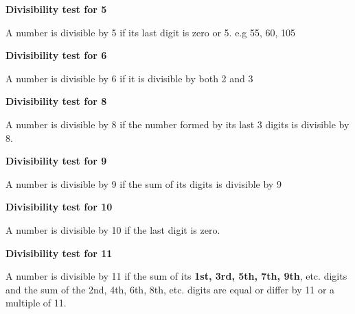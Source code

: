 \documentclass[
  letterpaper,
  DIV=11,
  numbers=noendperiod]{scrreprt}
\begin{document}
\textbf{Divisibility test for 5}

A number is divisible by 5 if its last digit is zero or 5. e.g 55, 60,
105

\textbf{Divisibility test for 6}

A number is divisible by 6 if it is divisible by both 2 and 3

\textbf{Divisibility test for 8}

A number is divisible by 8 if the number formed by its last 3 digits is
divisible by 8.

\textbf{Divisibility test for 9}

A number is divisible by 9 if the sum of its digits is divisible by 9

\textbf{Divisibility test for 10}

A number is divisible by 10 if the last digit is zero.

\textbf{Divisibility test for 11}

A number is divisible by 11 if the sum of its \textbf{1st, 3rd, 5th,
7th, 9th}, etc. digits and the sum of the 2nd, 4th, 6th, 8th, etc.
digits are equal or differ by 11 or a multiple of 11.
\end{document}
